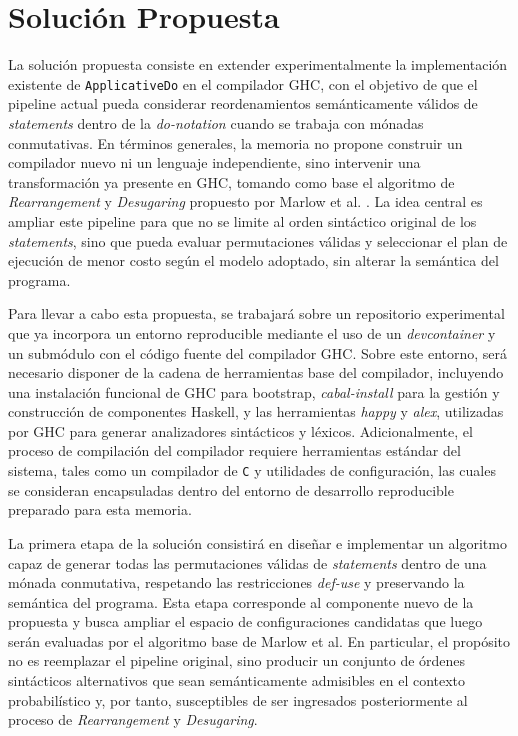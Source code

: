 \section{Solución Propuesta}\label{sec:sol_prop}

La solución propuesta consiste en extender experimentalmente la implementación existente de \texttt{ApplicativeDo} en el compilador \textsf{GHC}, con el objetivo de que el pipeline actual pueda considerar reordenamientos semánticamente válidos de \textit{statements} dentro de la \textit{do-notation} cuando se trabaja con mónadas conmutativas. En términos generales, la memoria no propone construir un compilador nuevo ni un lenguaje independiente, sino intervenir una transformación ya presente en \textsf{GHC}, tomando como base el algoritmo de \textit{Rearrangement} y \textit{Desugaring} propuesto por Marlow et al. \cite{MarlowPJKM2016}. La idea central es ampliar este pipeline para que no se limite al orden sintáctico original de los 	\textit{statements}, sino que pueda evaluar permutaciones válidas y seleccionar el plan de ejecución de menor costo según el modelo adoptado, sin alterar la semántica del programa.

\newpage

Para llevar a cabo esta propuesta, se trabajará sobre un repositorio experimental que ya incorpora un entorno reproducible mediante el uso de un \textit{devcontainer} y un submódulo con el código fuente del compilador \textsf{GHC}. Sobre este entorno, será necesario disponer de la cadena de herramientas base del compilador, incluyendo una instalación funcional de \textsf{GHC} para bootstrap, \textit{cabal-install} para la gestión y construcción de componentes \textsf{Haskell}, y las herramientas \textit{happy} y \textit{alex}, utilizadas por \textsf{GHC} para generar analizadores sintácticos y léxicos. Adicionalmente, el proceso de compilación del compilador requiere herramientas estándar del sistema, tales como un compilador de \texttt{C} y utilidades de configuración, las cuales se consideran encapsuladas dentro del entorno de desarrollo reproducible preparado para esta memoria.

La primera etapa de la solución consistirá en diseñar e implementar un algoritmo capaz de generar todas las permutaciones válidas de \textit{statements} dentro de una mónada conmutativa, respetando las restricciones \textit{def-use} y preservando la semántica del programa. Esta etapa corresponde al componente nuevo de la propuesta y busca ampliar el espacio de configuraciones candidatas que luego serán evaluadas por el algoritmo base de Marlow et al. En particular, el propósito no es reemplazar el pipeline original, sino producir un conjunto de órdenes sintácticos alternativos que sean semánticamente admisibles en el contexto probabilístico y, por tanto, susceptibles de ser ingresados posteriormente al proceso de \textit{Rearrangement} y \textit{Desugaring}.

